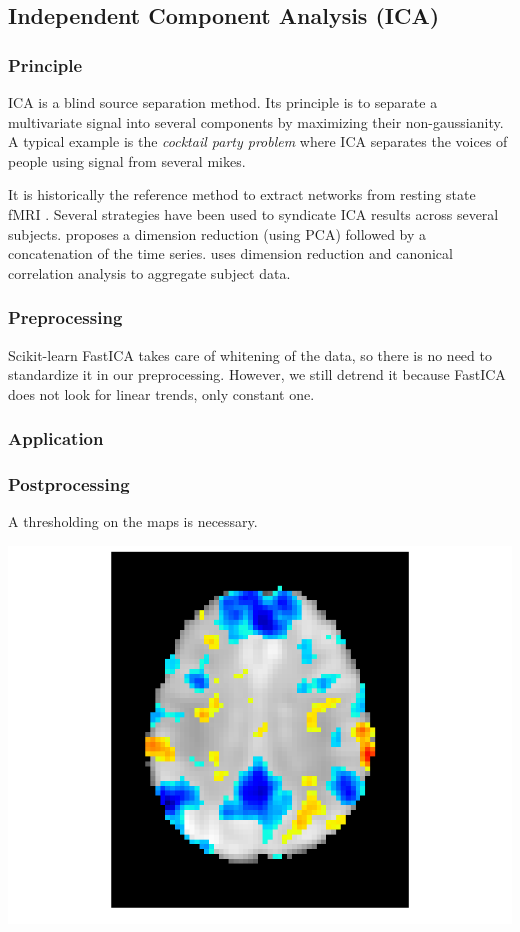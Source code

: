 \documentclass{frontiersSCNS} %
\begin{document}
\subsection{Independent Component Analysis (ICA)}

\subsubsection{Principle}

ICA is a blind source separation method. Its principle is to separate a
multivariate signal into several components by maximizing their non-gaussianity.
A typical example is the \emph{cocktail party problem} where ICA separates the
voices of people using signal from several mikes.

It is historically the reference method to extract networks from resting state
fMRI \cite{biswal1999}. Several strategies have been used to syndicate ICA
results across several subjects. \cite{calhoun2001a} proposes a dimension
reduction (using PCA) followed by a concatenation of the time series.
\cite{varoquaux2010} uses dimension reduction and canonical correlation analysis
to aggregate subject data.

\subsubsection{Preprocessing}

Scikit-learn FastICA takes care of whitening of the data, so there is no need to
standardize it in our preprocessing. However, we still detrend it because
FastICA does not look for linear trends, only constant one.

\subsubsection{Application}


\subsubsection{Postprocessing}

A thresholding on the maps is necessary.


\includegraphics[width=.5\linewidth]{img/plot_canica_resting_state_17.png}
\end{document}
